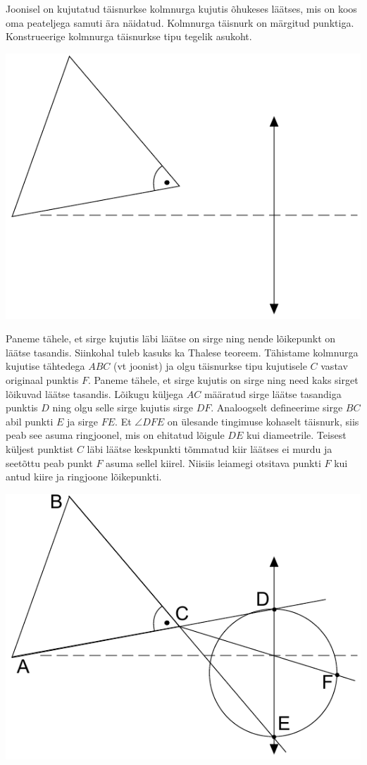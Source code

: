 
Joonisel on kujutatud täisnurkse kolmnurga kujutis õhukeses läätses, mis on koos oma peateljega samuti ära näidatud. Kolmnurga täisnurk on märgitud punktiga. Konstrueerige kolmnurga täisnurkse tipu tegelik asukoht.
\begin{center}
	\includegraphics[width = 0.6\linewidth]{2018-lahg-08-yl.pdf}
\end{center}\hint
Paneme tähele, et sirge kujutis läbi läätse on sirge ning nende lõikepunkt on läätse tasandis. Siinkohal tuleb kasuks ka Thalese teoreem.\solu
Tähistame kolmnurga kujutise tähtedega $ABC$ (vt joonist) ja olgu täisnurkse tipu kujutisele $C$ vastav originaal punktis $F$. Paneme tähele, et sirge kujutis on sirge ning need kaks sirget lõikuvad läätse tasandis. Lõikugu küljega $AC$ määratud sirge läätse tasandiga punktis $D$ ning olgu selle sirge kujutis sirge $DF$. Analoogselt defineerime sirge 
$BC$ abil punkti $E$ ja sirge $FE$. Et $\angle DFE$ on ülesande tingimuse kohaselt täisnurk, siis peab see asuma ringjoonel, mis on ehitatud lõigule $DE$ kui diameetrile. Teisest küljest punktist $C$ läbi läätse keskpunkti tõmmatud kiir läätses ei murdu ja seetõttu peab punkt $F$ asuma sellel kiirel. Niisiis leiamegi otsitava punkti $F$ kui antud kiire ja ringjoone lõikepunkti.
\begin{center}
	\includegraphics[width=0.5\linewidth]{2018-lahg-08-sol.pdf}
\end{center}\probend